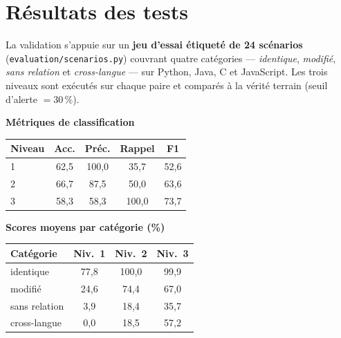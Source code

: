 \documentclass[10pt,a4paper]{article}
\begin{document}
\section{Résultats des tests}

La validation s'appuie sur un \textbf{jeu d'essai étiqueté de 24 scénarios}
(\texttt{evaluation/scenarios.py}) couvrant quatre catégories ---
\emph{identique}, \emph{modifié}, \emph{sans relation} et \emph{cross-langue}
--- sur Python, Java, C et JavaScript. Les trois niveaux sont exécutés sur
chaque paire et comparés à la vérité terrain (seuil d'alerte $=30\,\%$).

\begin{table}[h]
  \centering
  \small
  \begin{minipage}[t]{0.47\linewidth}
    \centering
    \textbf{Métriques de classification}\\[2pt]
    \begin{tabular}{lcccc}
      \toprule
      Niveau & Acc. & Préc. & Rappel & F1 \\
      \midrule
      1 & 62{,}5 & 100{,}0 & 35{,}7 & 52{,}6 \\
      2 & 66{,}7 & 87{,}5 & 50{,}0 & 63{,}6 \\
      3 & 58{,}3 & 58{,}3 & 100{,}0 & 73{,}7 \\
      \bottomrule
    \end{tabular}
  \end{minipage}\hfill
  \begin{minipage}[t]{0.49\linewidth}
    \centering
    \textbf{Scores moyens par catégorie (\%)}\\[2pt]
    \begin{tabular}{lccc}
      \toprule
      Catégorie & Niv.~1 & Niv.~2 & Niv.~3 \\
      \midrule
      identique     & 77{,}8 & 100{,}0 & 99{,}9 \\
      modifié       & 24{,}6 & 74{,}4 & 67{,}0 \\
      sans relation & 3{,}9 & 18{,}4 & 35{,}7 \\
      cross-langue  & 0{,}0 & 18{,}5 & 57{,}2 \\
      \bottomrule
    \end{tabular}
  \end{minipage}
\end{table}
\end{document}
